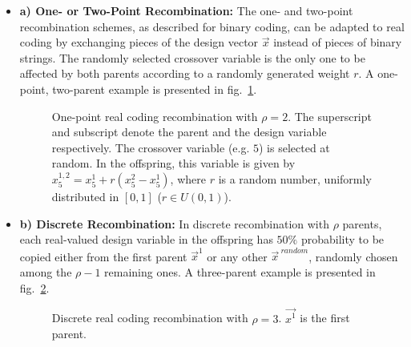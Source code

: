 \begin{itemize}
\FloatBarrier
\item[]{\bf a) One- or Two-Point Recombination:} The one- and two-point recombination schemes, as described for binary coding, can be adapted to real coding by exchanging  pieces of the design vector $\vec{x}$ instead of pieces of binary strings. The randomly selected crossover variable is the only one to be affected by both parents according to a randomly generated weight $r$. A one-point, two-parent example is presented in fig.\ \ref{1pxreal}.

\begin{figure}[h!]
\begin{minipage}[b]{1.0\linewidth}
 \centering
\end{minipage}
\caption{One-point real coding recombination with $\rho=2$. The superscript and subscript denote the parent and the design variable respectively. The crossover variable (e.g. $5$) is selected at random. In the offspring, this variable is given by  $x_5^{1,2}=x_5^{1}+r(x_5^{2}-x_5^{1})$, where $r$ is a random number, uniformly distributed in $[0,1]$ ($r \in U(0,1)$).    
} 
\label{1pxreal}
\end{figure}
 
\FloatBarrier 
\item[]{\bf b) Discrete Recombination:} In discrete recombination with $\rho$ parents, each real-valued design variable in the offspring has $50\%$ probability to be copied either from the first parent $\vec{x}^1$ or any other  $\vec{x}^{~random}$, randomly chosen among the $\rho\!-\!1$ remaining ones. A three-parent example is presented in fig.\ \ref{disc}.

\begin{figure}[h!]
\begin{minipage}[b]{1.0\linewidth}
 \centering
\end{minipage}
\caption{Discrete real coding recombination with $\rho=3$. $\vec{x^1}$ is the first parent.    
} 
\label{disc}
\end{figure}
    

\end{itemize}
